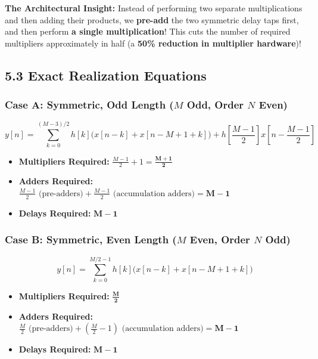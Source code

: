 \documentclass[11pt,a4paper]{article}
\begin{document}
\textbf{The Architectural Insight:}
Instead of performing two separate multiplications and then adding their products, we \textbf{pre-add} the two symmetric delay taps first, and then perform \textbf{a single multiplication}!
This cuts the number of required multipliers approximately in half (a \textbf{50\% reduction in multiplier hardware})!

\subsection{5.3 Exact Realization Equations}

\subsubsection{\texorpdfstring{Case A: Symmetric, Odd Length ($M$ Odd, Order $N$ Even)}{Case A: Symmetric, Odd Length}}
\begin{equation}
y[n] = \sum_{k=0}^{(M-3)/2} h[k] \Big( x[n-k] + x[n - M + 1 + k] \Big) + h\left[\frac{M-1}{2}\right] x\left[n - \frac{M-1}{2}\right]
\end{equation}
\begin{itemize}
    \item \textbf{Multipliers Required:} $\frac{M-1}{2} + 1 = \mathbf{\frac{M+1}{2}}$
    \item \textbf{Adders Required:} $\frac{M-1}{2} \text{ (pre-adders)} + \frac{M-1}{2} \text{ (accumulation adders)} = \mathbf{M - 1}$
    \item \textbf{Delays Required:} $\mathbf{M - 1}$
\end{itemize}

\subsubsection{\texorpdfstring{Case B: Symmetric, Even Length ($M$ Even, Order $N$ Odd)}{Case B: Symmetric, Even Length}}
\begin{equation}
y[n] = \sum_{k=0}^{M/2 - 1} h[k] \Big( x[n-k] + x[n - M + 1 + k] \Big)
\end{equation}
\begin{itemize}
    \item \textbf{Multipliers Required:} $\mathbf{\frac{M}{2}}$
    \item \textbf{Adders Required:} $\frac{M}{2} \text{ (pre-adders)} + \left(\frac{M}{2} - 1\right) \text{ (accumulation adders)} = \mathbf{M - 1}$
    \item \textbf{Delays Required:} $\mathbf{M - 1}$
\end{itemize}
\end{document}
